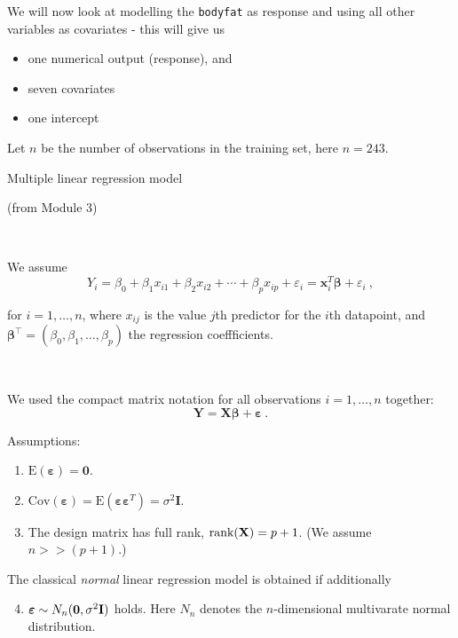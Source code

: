 \documentclass[10pt,ignorenonframetext,]{beamer}
\providecommand{\tightlist}{%
  \setlength{\itemsep}{0pt}\setlength{\parskip}{0pt}}
\begin{document}
\begin{frame}[fragile]

We will now look at modelling the \texttt{bodyfat} as response and using
all other variables as covariates - this will give us

\begin{itemize}
\tightlist
\item
  one numerical output (response), and
\item
  seven covariates
\item
  one intercept
\end{itemize}

Let \(n\) be the number of observations in the training set, here
\(n=243\).

\end{frame}

\begin{frame}

\begin{block}{Multiple linear regression model}

(from Module 3)

\(~\)

We assume \[
 Y_i=\beta_0 + \beta_1 x_{i1}+\beta_2 x_{i2}+\cdots + \beta_p x_{ip}+\varepsilon_i={\boldsymbol x}_i^T{\boldsymbol\beta}+\varepsilon_i \ ,
\]

for \(i=1,\ldots,n\), where \(x_{ij}\) is the value \(j\)th predictor
for the \(i\)th datapoint, and
\({\boldsymbol\beta}^\top = (\beta_0,\beta_1,\ldots,\beta_p)\) the
regression coeffficients.

\(~\)

We used the compact matrix notation for all observations
\(i=1,\ldots,n\) together:
\[{\boldsymbol Y}={\boldsymbol {X}} \boldsymbol{\beta}+{\boldsymbol{\varepsilon}}  \ .\]

\end{block}

\end{frame}

\begin{frame}

Assumptions:

\begin{enumerate}
\tightlist
\item
  \(\text{E}(\boldsymbol{\varepsilon})=\boldsymbol{0}\).
\item
  \(\text{Cov}(\boldsymbol{\varepsilon})=\text{E}(\boldsymbol{\varepsilon}\boldsymbol{\varepsilon}^T)=\sigma^2\boldsymbol{I}\).
\item
  The design matrix has full rank, \(\text{rank}({\bf X})=p+1\). (We
  assume \(n>>(p+1)\).)
\end{enumerate}

The classical \emph{normal} linear regression model is obtained if
additionally

\begin{enumerate}
\setcounter{enumi}{3}
\tightlist
\item
  \(\boldsymbol\varepsilon\sim N_n({\boldsymbol 0},\sigma^2 {\bf I})\)
  holds. Here \(N_n\) denotes the \(n\)-dimensional multivarate normal
  distribution.
\end{enumerate}

\end{frame}
\end{document}
